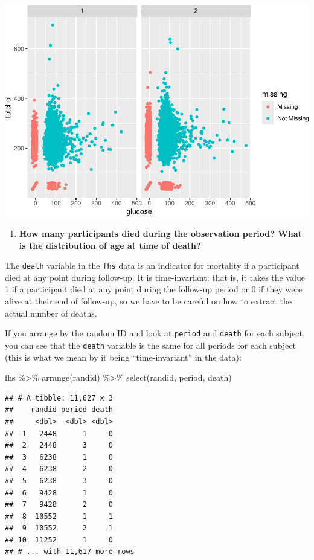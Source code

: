 \documentclass[
]{book}
\newenvironment{Shaded}{\begin{snugshade}}{\end{snugshade}}
\newcommand{\FunctionTok}[1]{\textcolor[rgb]{0.00,0.00,0.00}{#1}}
\newcommand{\NormalTok}[1]{#1}
\newcommand{\SpecialCharTok}[1]{\textcolor[rgb]{0.00,0.00,0.00}{#1}}
\providecommand{\tightlist}{%
  \setlength{\itemsep}{0pt}\setlength{\parskip}{0pt}}
\begin{document}
\includegraphics{adv_epi_analysis_files/figure-latex/unnamed-chunk-178-1.pdf}

\begin{enumerate}
\def\labelenumi{\arabic{enumi}.}
\setcounter{enumi}{2}
\tightlist
\item
  \textbf{How many participants died during the observation period? What is the distribution of age at time of death?}
\end{enumerate}

The \texttt{death} variable in the \texttt{fhs} data is an indicator for mortality if a participant died at any point during follow-up. It is time-invariant: that is, it takes the value 1 if a participant died at any point during the follow-up period or 0 if they were alive at their end of follow-up, so we have to be careful on how to extract the actual number of deaths.

If you arrange by the random ID and look at \texttt{period} and \texttt{death} for each subject,
you can see that the \texttt{death} variable is the same for all periods for each
subject (this is what we mean by it being ``time-invariant'' in the data):

\begin{Shaded}
\begin{Highlighting}[]
\NormalTok{fhs }\SpecialCharTok{\%\textgreater{}\%} 
  \FunctionTok{arrange}\NormalTok{(randid) }\SpecialCharTok{\%\textgreater{}\%} 
  \FunctionTok{select}\NormalTok{(randid, period, death)}
\end{Highlighting}
\end{Shaded}

\begin{verbatim}
## # A tibble: 11,627 x 3
##    randid period death
##     <dbl>  <dbl> <dbl>
##  1   2448      1     0
##  2   2448      3     0
##  3   6238      1     0
##  4   6238      2     0
##  5   6238      3     0
##  6   9428      1     0
##  7   9428      2     0
##  8  10552      1     1
##  9  10552      2     1
## 10  11252      1     0
## # ... with 11,617 more rows
\end{verbatim}
\end{document}
